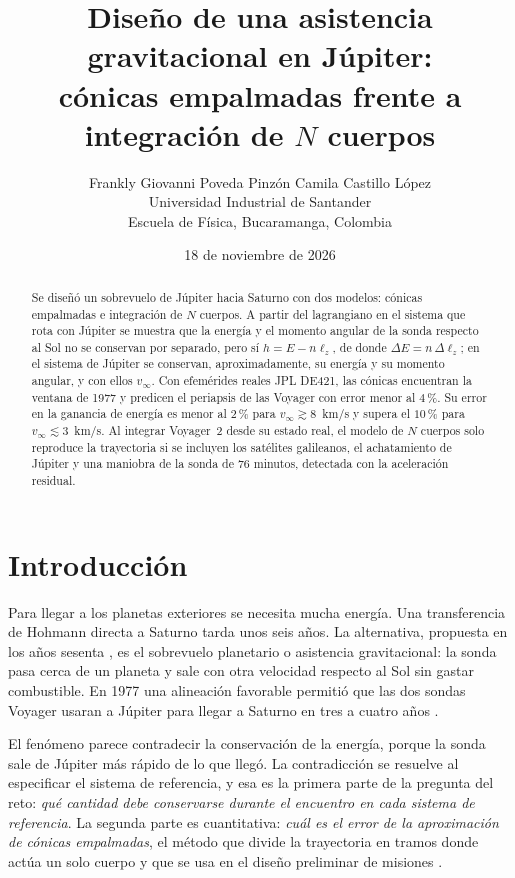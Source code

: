 \documentclass[11pt,letterpaper]{article}
\title{Diseño de una asistencia gravitacional en Júpiter:\\
cónicas empalmadas frente a integración de $N$ cuerpos}
\author{Frankly Giovanni Poveda Pinzón
\quad\quad Camila Castillo López\\[4pt]
Universidad Industrial de Santander\\
Escuela de Física, Bucaramanga, Colombia}
\date{18 de noviembre de 2026}
\newcommand{\vinf}{v_\infty}
\begin{document}
\renewcommand{\contentsname}{Índice}
\maketitle
\thispagestyle{fancy}



\setcounter{tocdepth}{1}
\tableofcontents

\begin{abstract}
Se diseñó un sobrevuelo de Júpiter hacia Saturno con dos modelos: cónicas empalmadas e
integración de $N$ cuerpos. A partir del lagrangiano en el sistema que rota con Júpiter se
muestra que la energía y el momento angular de la sonda respecto al Sol no se conservan por
separado, pero sí $h = E - n\ell_z$, de donde $\Delta E = n\,\Delta\ell_z$; en el sistema de
Júpiter se conservan, aproximadamente, su energía y su momento angular, y con ellos $\vinf$. Con
efemérides reales JPL DE421, las cónicas encuentran la ventana de 1977 y predicen el periapsis
de las Voyager con error menor al $4\,\%$. Su error en la ganancia de energía es menor al
$2\,\%$ para $\vinf \gtrsim 8$~km/s y supera el $10\,\%$ para $\vinf \lesssim 3$~km/s. Al
integrar Voyager~2 desde su estado real, el modelo de $N$ cuerpos solo reproduce la trayectoria
si se incluyen los satélites galileanos, el achatamiento de Júpiter y una maniobra de la sonda
de 76 minutos, detectada con la aceleración residual.
\end{abstract}



\section{Introducción}

Para llegar a los planetas exteriores se necesita mucha energía. Una transferencia de Hohmann
directa a Saturno tarda unos seis años. La alternativa, propuesta en los años sesenta
\cite{flandro1966}, es el sobrevuelo planetario o asistencia gravitacional: la sonda pasa cerca
de un planeta y sale con otra velocidad respecto al Sol sin gastar combustible. En 1977 una
alineación favorable permitió que las dos sondas Voyager usaran a Júpiter para llegar a
Saturno en tres a cuatro años \cite{kohlhase1977}.

El fenómeno parece contradecir la conservación de la energía, porque la sonda sale de Júpiter
más rápido de lo que llegó. La contradicción se resuelve al especificar el sistema de
referencia, y esa es la primera parte de la pregunta del reto: \emph{qué cantidad debe
conservarse durante el encuentro en cada sistema de referencia}. La segunda parte es
cuantitativa: \emph{cuál es el error de la aproximación de cónicas empalmadas}, el método que
divide la trayectoria en tramos donde actúa un solo cuerpo y que se usa en el diseño
preliminar de misiones \cite{curtis2020}.
\end{document}
